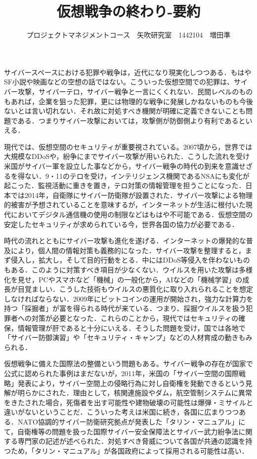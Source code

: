 \documentclass[uplatex,twocolumn,dvipdfmx]{jsarticle}
\title{\vspace{-5mm}\fontsize{14pt}{0pt}\selectfont 仮想戦争の終わり-要約}
\author{\normalsize プロジェクトマネジメントコース　矢吹研究室　1442104　増田準}
\date{}
\begin{document}
\fontsize{10.5pt}{\baselineskip}\selectfont
\maketitle





サイバースペースにおける犯罪や戦争は，近代になり現実化しつつある．もはやSF小説や映画などの空想の話ではない。こういった仮想空間での犯罪は、サイバー攻撃，サイバーテロ，サイバー戦争と一言にくくれない．民間レベルのものもあれば，企業を狙った犯罪，更には物理的な戦争に発展しかねないものも今後ないとは言い切れない．それ故に対処すべき機関が明確に定義できないことも問題である．つまりサイバー攻撃においては，攻撃側が防御側より有利であるといえる．

現代では、仮想空間のセキュリティが重要視されている。2007頃から，世界では大規模なDDoSや，紛争にまでサイバー攻撃が用いられた．こうした流れを受け米国がサイバー軍を設立した事などから，サイバー戦争の時代の到来を意識せざるを得ない．9・11のテロを受け，インテリジェンス機関であるNSAにも変化が起こった．監視活動に重きを置き，テロ対策の情報管理を担うことになった．日本では2014年，自衛隊にサイバー防衛隊が設置された．サイバー攻撃による物理的被害が予想されていることを意味するが，インターネットが生活に根付いた現代においてデジタル通信機の使用の制限などはもはや不可能である．仮想空間の安定したセキュリティが求められている今，世界各国の協力が必要である．

時代の流れとともにサイバー攻撃も進化を遂げる．インターネットの爆発的な普及により，個人間の情報対策も義務的になった．サイバー攻撃を整理すると，まず侵入し，拡大し，そして目的行動をとる．中にはDDoS等侵入を伴わないものもある．このように対策すべき項目が少なくない．ウイルスを用いた攻撃は多様化を見せ，PCやスマホなど「機械」の一般化から，AIなどの「機械学習」の成長が目覚ましい．こうした技術もウイルスの悪質化に取り入れられることを想定しなければならない．2009年にビットコインの運用が開始され，強力な計算力を持つ「採掘者」が富を得られる時代が来ている．つまり、採掘ウイルスを扱う犯罪者への対策が必要となった．これらのことから，現代ではセキュリティの確保，情報管理が肝であると十分にいえる．そうした問題を受け，国では各地で「サイバー防御演習」や「セキュリティ・キャンプ」などの人材育成の動きもみられる．

仮想戦争に備えた国際法の整備という問題もある。サイバー戦争の存在が国家で公式に認められた事例はまだないが，2011年，米国の「サイバー空間の国際戦略」発表により，サイバー空間上の侵略行為に対し自衛権を発動できるという見解が明らかにされた．理由として，核関連施設やダム，航空管制システムに異常をきたされた場合，死傷者を出す可能性や建物破壊の可能性は爆弾・ミサイルと違いがないということだ．こういった考えは米国に続き，各国に広まりつつある．NATO協調的サイバー防衛研究拠点が発表した「タリン・マニュアル」にて，自衛権等の問題を扱った国際サイバー安全保障法とサイバー武力紛争法に関する専門家の記述が述べられた．対処すべき脅威について各国が共通の認識を持つため，「タリン・マニュアル」が各国政府によって採用される可能性は高い．
\end{document}
